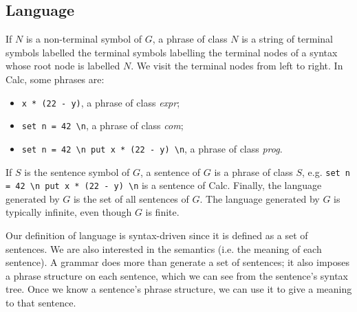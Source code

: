 \documentclass[a4paper, openany]{memoir}
\begin{document}
\subsection{Language}
If $N$ is a non-terminal symbol of $G$, a phrase of class $N$ is a string of terminal symbols labelled the terminal symbols labelling the terminal nodes of a syntax whose root node is labelled $N$. We visit the terminal nodes from left to right. In Calc, some phrases are:
\begin{itemize}
    \item \texttt{x * (22 - y)}, a phrase of class \textit{expr};
    \item \texttt{set n = 42 \textbackslash n}, a phrase of class \textit{com};
    \item \texttt{set n = 42 \textbackslash n put x * (22 - y) \textbackslash n}, a phrase of class \textit{prog}.
\end{itemize}
If $S$ is the sentence symbol of $G$, a sentence of $G$ is a phrase of class $S$, e.g. \texttt{set n = 42 \textbackslash n put x * (22 - y) \textbackslash n} is a sentence of Calc. Finally, the language generated by $G$ is the set of all sentences of $G$. The language generated by $G$ is typically infinite, even though $G$ is finite.

Our definition of language is syntax-driven since it is defined as a set of sentences. We are also interested in the semantics (i.e. the meaning of each sentence). A grammar does more than generate a set of sentences; it also imposes a phrase structure on each sentence, which we can see from the sentence's syntax tree. Once we know a sentence's phrase structure, we can use it to give a meaning to that sentence.
\end{document}
